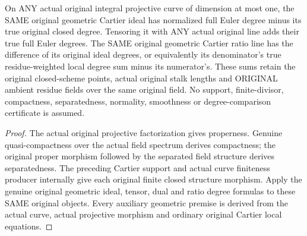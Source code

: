 \begin{theorem}
\label{thm:fc-curve-cartier-ideal-degrees}
\leanok
{}
On ANY actual original integral projective curve of dimension at most one,
the SAME original geometric Cartier ideal has normalized full Euler degree
minus its true original closed degree. Tensoring it with ANY actual original
line adds their true full Euler degrees. The SAME original geometric
Cartier ratio line has the difference of its original ideal degrees, or
equivalently its denominator's true residue-weighted local degree sum minus
its numerator's. These sums retain the original closed-scheme points,
actual original stalk lengths and ORIGINAL ambient residue fields over the
same original field. No support, finite-divisor, compactness, separatedness,
normality, smoothness or degree-comparison certificate is assumed.
\end{theorem}
\begin{proof}
The actual original projective factorization gives properness. Genuine
quasi-compactness over the actual field spectrum derives compactness; the
original proper morphism followed by the separated field structure derives
separatedness. The preceding Cartier support and actual curve finiteness
producer internally give each original finite closed structure morphism.
Apply the genuine original geometric ideal, tensor, dual and ratio degree
formulas to these SAME original objects. Every auxiliary geometric premise
is derived from the actual curve, actual projective morphism and ordinary
original Cartier local equations.
\end{proof}
